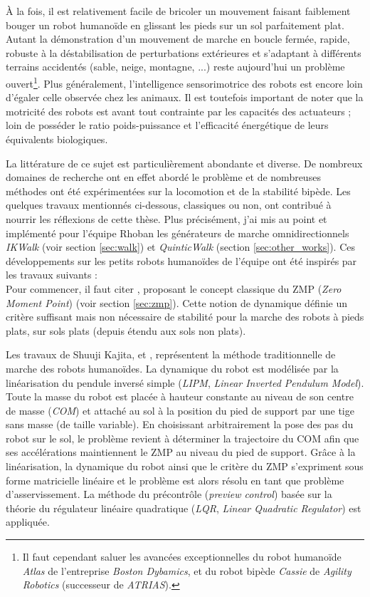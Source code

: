 À la fois, il est relativement facile de \og bricoler \fg
un mouvement faisant faiblement bouger un robot humanoïde
en glissant les pieds sur un sol parfaitement plat.
Autant la démonstration d'un mouvement de marche en boucle fermée,
rapide, robuste à la déstabilisation de perturbations extérieures
et s'adaptant à différents terrains accidentés (sable, neige, montagne, ...) 
reste aujourd'hui un problème ouvert\footnote{Il faut cependant saluer les avancées 
exceptionnelles du robot humanoïde \textit{Atlas} de l'entreprise \textit{Boston Dybamics}, 
et du robot bipède \textit{Cassie} de \textit{Agility Robotics} (successeur de \textit{ATRIAS}).}.
Plus généralement, l'intelligence sensorimotrice des robots est encore loin 
d'égaler celle observée chez les animaux.
Il est toutefois important de noter que la motricité des robots est avant tout 
contrainte par les capacités des actuateurs ; loin de posséder le ratio poids-puissance
et l'efficacité énergétique de leurs équivalents biologiques.

La littérature de ce sujet est particulièrement abondante et diverse.
De nombreux domaines de recherche ont en effet abordé le problème
et de nombreuses méthodes ont été expérimentées sur 
la locomotion et de la stabilité bipède.
Les quelques travaux mentionnés ci-dessous, classiques ou non,
ont contribué à nourrir les réflexions de cette thèse.
Plus précisément, j'ai mis au point et implémenté pour l'équipe Rhoban
les générateurs de marche omnidirectionnels \textit{IKWalk} (voir section \ref{sec:walk})
et \textit{QuinticWalk} (section \ref{sec:other_works}).
Ces développements sur les petits robots humanoïdes de l'équipe
ont été inspirés par les travaux suivants :\\

Pour commencer, il faut citer \cite{vukobratovic_zero-moment_2004},
proposant le concept classique du ZMP (\textit{Zero Moment Point}) 
(voir section \ref{sec:zmp}).
Cette notion de dynamique définie un critère suffisant mais non nécessaire 
de stabilité pour la marche des robots à pieds plats, sur sols plats
(depuis étendu aux sols non plats).

Les travaux de Shuuji Kajita, \cite{kajita_3d_2001} et \cite{kajita_biped_2003},
représentent la méthode \og traditionnelle \fg de marche 
des robots humanoïdes.
La dynamique du robot est modélisée par la linéarisation du pendule inversé simple
(\textit{LIPM}, \textit{Linear Inverted Pendulum Model}).
Toute la masse du robot est placée à hauteur constante au niveau de 
son centre de masse (\textit{COM}) et attaché au sol à la position du
pied de support par une tige sans masse (de taille variable).
En choisissant arbitrairement la pose des pas du robot sur le sol,
le problème revient à déterminer la trajectoire du COM afin que
ses accélérations maintiennent le ZMP au niveau du pied de support.
Grâce à la linéarisation, la dynamique du robot ainsi 
que le critère du ZMP s'expriment sous forme matricielle linéaire
et le problème est alors résolu en tant que problème d'asservissement.
La méthode du précontrôle (\textit{preview control}) basée
sur la théorie du régulateur linéaire quadratique 
(\textit{LQR}, \textit{Linear Quadratic Regulator}) est appliquée.

